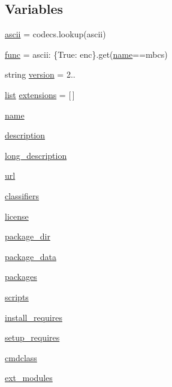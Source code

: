 \subsection*{Variables}
\begin{DoxyCompactItemize}
\item 
\mbox{\hyperlink{namespacepymavlink_1_1setup_af49bf7d7e6e9bb578d581790bb0ebcd9}{ascii}} = codecs.\+lookup(\textquotesingle{}ascii\textquotesingle{})
\item 
\mbox{\hyperlink{namespacepymavlink_1_1setup_a1ec9a3e6c98c55cfef7cc134132efc87}{func}} = ascii\+: \{True\+: enc\}.get(\mbox{\hyperlink{namespacepymavlink_1_1setup_a55c91544e4a7dec3602cb3fea4f16a62}{name}}==\textquotesingle{}mbcs\textquotesingle{})
\item 
string \mbox{\hyperlink{namespacepymavlink_1_1setup_a4e79261a2d80e5c8ccaa814e5bcbfb22}{version}} = \textquotesingle{}2..\textquotesingle{}
\item 
\mbox{\hyperlink{structlist}{list}} \mbox{\hyperlink{namespacepymavlink_1_1setup_a60c77987987b192b5c313eb3529cec96}{extensions}} = \mbox{[}$\,$\mbox{]}
\item 
\mbox{\hyperlink{namespacepymavlink_1_1setup_a55c91544e4a7dec3602cb3fea4f16a62}{name}}
\item 
\mbox{\hyperlink{namespacepymavlink_1_1setup_a57fe69254a2232c81daae3d484d23341}{description}}
\item 
\mbox{\hyperlink{namespacepymavlink_1_1setup_ab0ce4bf4ba59fce6db9c118b407168af}{long\+\_\+description}}
\item 
\mbox{\hyperlink{namespacepymavlink_1_1setup_a832d0f1238d74b4923cc2d2b2c9606f2}{url}}
\item 
\mbox{\hyperlink{namespacepymavlink_1_1setup_a3f9c769d98db4192cbe766b144e30730}{classifiers}}
\item 
\mbox{\hyperlink{namespacepymavlink_1_1setup_a56529a23eeb8724710e306b22357e8e3}{license}}
\item 
\mbox{\hyperlink{namespacepymavlink_1_1setup_acb29c0608917745a4430eec79b719154}{package\+\_\+dir}}
\item 
\mbox{\hyperlink{namespacepymavlink_1_1setup_af5f94b76aa681079a0e6d64082abc9d4}{package\+\_\+data}}
\item 
\mbox{\hyperlink{namespacepymavlink_1_1setup_a6b0f5b44566c2d44cdf6d4d14c4fe510}{packages}}
\item 
\mbox{\hyperlink{namespacepymavlink_1_1setup_ad9dbb37bdb6098c8ce17b3e184cf91f4}{scripts}}
\item 
\mbox{\hyperlink{namespacepymavlink_1_1setup_ae34a06fe05438ebc8c1dfe9474f6dc5b}{install\+\_\+requires}}
\item 
\mbox{\hyperlink{namespacepymavlink_1_1setup_ab6805df8a7b7a8b9e9bb8042468be725}{setup\+\_\+requires}}
\item 
\mbox{\hyperlink{namespacepymavlink_1_1setup_a2f4875cc9db87ed1d0eac76603c11178}{cmdclass}}
\item 
\mbox{\hyperlink{namespacepymavlink_1_1setup_a2f9bc2c575ce725e2bf7a3279edccf41}{ext\+\_\+modules}}
\end{DoxyCompactItemize}


